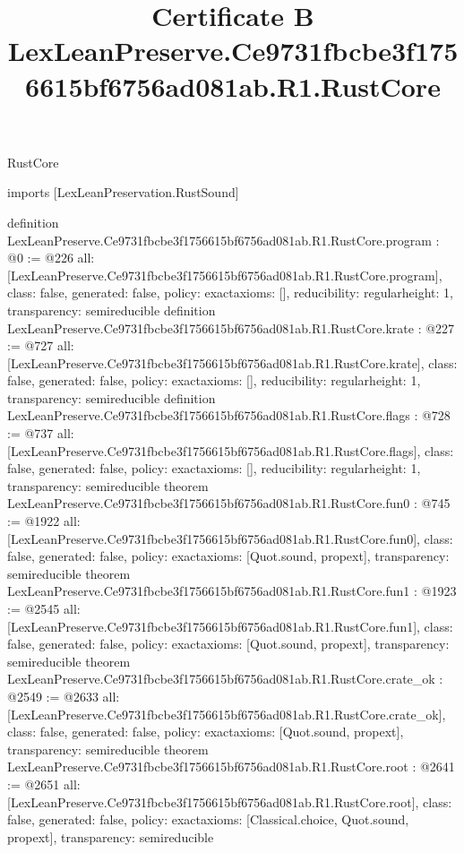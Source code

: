 \begin{lexlean}{RustCore}
\title{Certificate B LexLeanPreserve.Ce9731fbcbe3f1756615bf6756ad081ab.R1.RustCore}
\begin{coremodule}
imports [LexLeanPreservation.RustSound]

definition LexLeanPreserve.Ce9731fbcbe3f1756615bf6756ad081ab.R1.RustCore.program : @0 := @226 {
  all: [LexLeanPreserve.Ce9731fbcbe3f1756615bf6756ad081ab.R1.RustCore.program],
  class: false,
  generated: false,
  policy: exact{axioms: []},
  reducibility: regular{height: 1},
  transparency: semireducible
}
definition LexLeanPreserve.Ce9731fbcbe3f1756615bf6756ad081ab.R1.RustCore.krate : @227 := @727 {
  all: [LexLeanPreserve.Ce9731fbcbe3f1756615bf6756ad081ab.R1.RustCore.krate],
  class: false,
  generated: false,
  policy: exact{axioms: []},
  reducibility: regular{height: 1},
  transparency: semireducible
}
definition LexLeanPreserve.Ce9731fbcbe3f1756615bf6756ad081ab.R1.RustCore.flags : @728 := @737 {
  all: [LexLeanPreserve.Ce9731fbcbe3f1756615bf6756ad081ab.R1.RustCore.flags],
  class: false,
  generated: false,
  policy: exact{axioms: []},
  reducibility: regular{height: 1},
  transparency: semireducible
}
theorem LexLeanPreserve.Ce9731fbcbe3f1756615bf6756ad081ab.R1.RustCore.fun0 : @745 := @1922 {
  all: [LexLeanPreserve.Ce9731fbcbe3f1756615bf6756ad081ab.R1.RustCore.fun0],
  class: false,
  generated: false,
  policy: exact{axioms: [Quot.sound, propext]},
  transparency: semireducible
}
theorem LexLeanPreserve.Ce9731fbcbe3f1756615bf6756ad081ab.R1.RustCore.fun1 : @1923 := @2545 {
  all: [LexLeanPreserve.Ce9731fbcbe3f1756615bf6756ad081ab.R1.RustCore.fun1],
  class: false,
  generated: false,
  policy: exact{axioms: [Quot.sound, propext]},
  transparency: semireducible
}
theorem LexLeanPreserve.Ce9731fbcbe3f1756615bf6756ad081ab.R1.RustCore.crate_ok : @2549 := @2633 {
  all: [LexLeanPreserve.Ce9731fbcbe3f1756615bf6756ad081ab.R1.RustCore.crate_ok],
  class: false,
  generated: false,
  policy: exact{axioms: [Quot.sound, propext]},
  transparency: semireducible
}
theorem LexLeanPreserve.Ce9731fbcbe3f1756615bf6756ad081ab.R1.RustCore.root : @2641 := @2651 {
  all: [LexLeanPreserve.Ce9731fbcbe3f1756615bf6756ad081ab.R1.RustCore.root],
  class: false,
  generated: false,
  policy: exact{axioms: [Classical.choice, Quot.sound, propext]},
  transparency: semireducible
}


\end{coremodule}
\end{lexlean}
